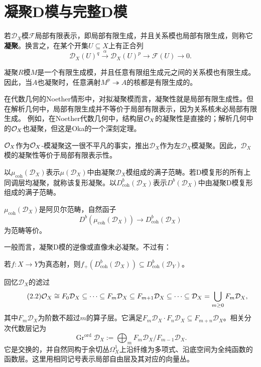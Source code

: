 \section{凝聚D模与完整D模}\label{L14S2}
若$\mathcal D_X$模$\mathcal F$局部有限表示，即局部有限生成，并且关系模也局部有限生成，则称它\textbf{凝聚}。换言之，在某个开集$U\subseteq X$上有正合列
\begin{equation}\tag{2.1}\label{L14eq21}
\mathcal D_X(U)^q\xrightarrow{\alpha}\mathcal D_X(U)^p\longrightarrow\mathcal F(U)\longrightarrow0.
\end{equation}
\begin{note}[L14S2O1]
凝聚$R$模$M$是一个有限生成模，并且任意有限组生成元之间的关系模也有限生成。因此，当$A$也凝聚时，任意满射$M^p\twoheadrightarrow A$的核都是有限生成的。

在代数几何的Noether情形中，对拟凝聚模而言，凝聚性就是局部有限生成性。但在解析几何中，局部有限生成并不等价于局部有限表示，因为关系核未必局部有限生成。
例如，在Noether代数几何中，结构层$\mathcal O_X$的凝聚性是直接的；解析几何中的$\mathcal O_X$也凝聚，但这是Oka的一个深刻定理。

$\mathcal O_X$作为$\mathcal O_X$-模凝聚这一很不平凡的事实，推出$\mathcal D_X$作为左$\mathcal D_X$模凝聚。因此，$\mathcal D_X$模的凝聚性等价于局部有限表示性。
\end{note}
以$\mu_{\mathrm{coh}}(\mathcal D_X)$表示$\mu(\mathcal D_X)$中由凝聚$\mathcal D_X$模组成的满子范畴。若D模复形的所有上同调层均凝聚，就称该复形凝聚。以$D_{\mathrm{coh}}^b(\mathcal D_X)$表示$D^b(\mathcal D_X)$中由凝聚D模复形组成的满子范畴。
\begin{proposition}\label{L14S2O2}
$\mu_{\mathrm{coh}}(\mathcal D_X)$是阿贝尔范畴，自然函子
\[D^b(\mu_{\mathrm{coh}}(\mathcal D_X))\longrightarrow D_{\mathrm{coh}}^b(\mathcal D_X)\]
为范畴等价。
\end{proposition}
一般而言，凝聚D模的逆像或直像未必凝聚。不过有：
\begin{proposition}\label{L14S2O3}
若$f:X\to Y$为真态射，则$f_+(D_{\mathrm{coh}}^b(\mathcal D_X))\subseteq D_{\mathrm{coh}}^b(\mathcal D_Y)$。
\end{proposition}
回忆$\mathcal D_X$的滤过
\begin{equation}\tag{2.2}\label{L14eq22}
\mathcal O_X\cong F_0\mathcal D_X\subseteq\cdots\subseteq F_m\mathcal D_X\subseteq F_{m+1}\mathcal D_X\subseteq\cdots\subseteq\mathcal D_X=\bigcup_{m\ge0}F_m\mathcal D_X,
\end{equation}
其中$F_m\mathcal D_X$为阶数不超过$m$的算子层。它满足$F_m\mathcal D_X\cdot F_n\mathcal D_X\subseteq F_{m+n}\mathcal D_X$。相关分次代数层记为
\[\operatorname{Gr}^{\mathrm{ord}}\mathcal D_X:=\bigoplus_mF_m\mathcal D_X/F_{m-1}\mathcal D_X.\]
它是交换的，并自然同构于余切丛$\Omega_X^1$上沿纤维为多项式、沿底空间为全纯函数的函数层。这里用相同记号表示局部自由层及其对应的向量丛。

